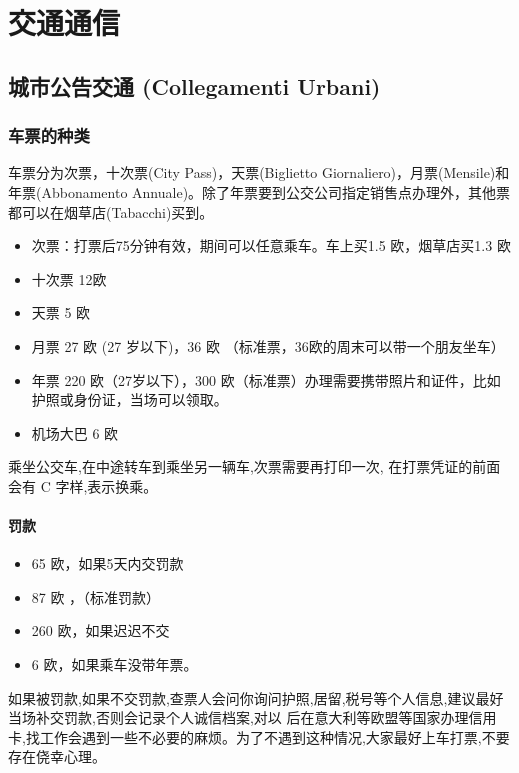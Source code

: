 
% 


\chapter{交通通信}                 %

\section{城市公告交通 (Collegamenti Urbani)}

\subsection{车票的种类}
车票分为次票，十次票(City Pass)，天票(Biglietto Giornaliero)，月票(Mensile)和年票(Abbonamento Annuale)。除了年票要到公交公司指定销售点办理外，其他票都可以在烟草店(Tabacchi)买到。
\begin{itemize}
\item  次票：打票后75分钟有效，期间可以任意乘车。车上买1.5 欧，烟草店买1.3 欧
\item  十次票 12欧
\item  天票 5 欧
\item  月票 27 欧 (27 岁以下)，36 欧 （标准票，36欧的周末可以带一个朋友坐车）
\item  年票 220 欧（27岁以下），300 欧（标准票）办理需要携带照片和证件，比如护照或身份证，当场可以领取。
\item  机场大巴 6 欧
\end{itemize}
乘坐公交车,在中途转车到乘坐另一辆车,次票需要再打印一次, 在打票凭证的前面会有 C 字样,表示换乘。

\subsubsection{罚款}
\begin{itemize}
\item  65 欧，如果5天内交罚款
\item  87 欧 ，（标准罚款）
\item  260 欧，如果迟迟不交
\item  6 欧，如果乘车没带年票。
\end{itemize}
如果被罚款,如果不交罚款,查票人会问你询问护照,居留,税号等个人信息,建议最好当场补交罚款,否则会记录个人诚信档案,对以 后在意大利等欧盟等国家办理信用卡,找工作会遇到一些不必要的麻烦。为了不遇到这种情况,大家最好上车打票,不要存在侥幸心理。\\

